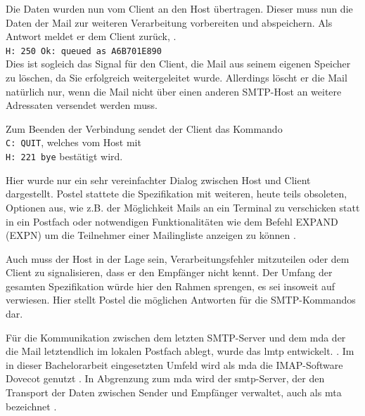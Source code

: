 Die Daten wurden nun vom Client an den Host übertragen. Dieser muss nun die Daten der Mail zur weiteren Verarbeitung vorbereiten und abspeichern. Als Antwort meldet er dem Client zurück,  \citep[][25]{Heinlein2004}.\\
\verb+H: 250 Ok: queued as A6B701E890+ \\
Dies ist sogleich das Signal für den Client, die Mail aus seinem eigenen Speicher zu löschen, da Sie erfolgreich weitergeleitet wurde. Allerdings löscht er die Mail natürlich nur, wenn die Mail nicht über einen anderen SMTP-Host an weitere Adressaten versendet werden muss.

Zum Beenden der Verbindung sendet der Client das Kommando \\
\verb+C: QUIT+, welches vom Host mit \\
\verb+H: 221 bye+ bestätigt wird. 

Hier wurde nur ein sehr vereinfachter Dialog zwischen Host und Client dargestellt. Postel stattete die Spezifikation mit weiteren, heute teils obsoleten, Optionen aus, wie z.B. der Möglichkeit Mails an ein Terminal zu verschicken statt in ein Postfach \citep[vgl.][11]{rfc821} oder notwendigen Funktionalitäten wie dem Befehl EXPAND (EXPN) um die Teilnehmer einer Mailingliste anzeigen zu können \citep[vgl.][8]{rfc821}.
\citereset

Auch muss der Host in der Lage sein, Verarbeitungsfehler mitzuteilen oder dem Client zu signalisieren, dass er den Empfänger nicht kennt. Der Umfang der gesamten Spezifikation würde hier den Rahmen sprengen, es sei insoweit auf \cite[][S. 37 ff.]{rfc821} verwiesen. Hier stellt Postel die möglichen Antworten für die SMTP-Kommandos dar.

Für die Kommunikation zwischen dem letzten SMTP-Server und dem \ac{mda} \citep[vgl.][28]{Heinlein2004} der die Mail letztendlich im lokalen Postfach ablegt, wurde das \ac{lmtp} entwickelt.  \citep[][39]{Heinlein2004}. Im in dieser Bachelorarbeit eingesetzten Umfeld wird als \ac{mda} die IMAP-Software Dovecot genutzt \citep[vgl.][]{dovecotlmtp}. In Abgrenzung zum \ac{mda} wird der \ac{smtp}-Server, der den Transport der Daten zwischen Sender und Empfänger verwaltet, auch als \ac{mta} bezeichnet \citep[vgl.][28]{Heinlein2004}.

